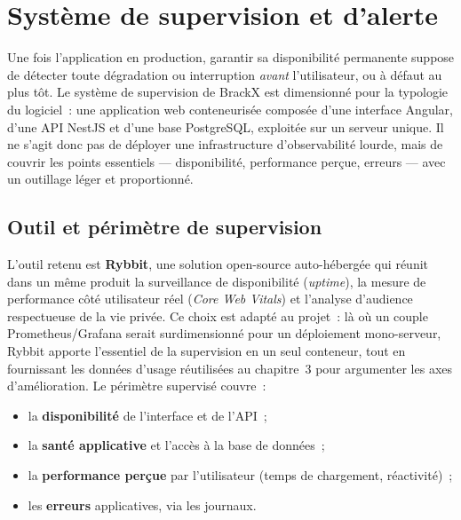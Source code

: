 \section{Système de supervision et d'alerte}
\label{sec:supervision}

Une fois l'application en production, garantir sa disponibilité permanente suppose de détecter toute dégradation ou interruption \emph{avant} l'utilisateur, ou à défaut au plus tôt. Le système de supervision de BrackX est dimensionné pour la typologie du logiciel~: une application web conteneurisée composée d'une interface Angular, d'une API NestJS et d'une base PostgreSQL, exploitée sur un serveur unique. Il ne s'agit donc pas de déployer une infrastructure d'observabilité lourde, mais de couvrir les points essentiels — disponibilité, performance perçue, erreurs — avec un outillage léger et proportionné.

\subsection{Outil et périmètre de supervision}
L'outil retenu est \textbf{Rybbit}, une solution open-source auto-hébergée qui réunit dans un même produit la surveillance de disponibilité (\emph{uptime}), la mesure de performance côté utilisateur réel (\emph{Core Web Vitals}) et l'analyse d'audience respectueuse de la vie privée. Ce choix est adapté au projet~: là où un couple Prometheus/Grafana serait surdimensionné pour un déploiement mono-serveur, Rybbit apporte l'essentiel de la supervision en un seul conteneur, tout en fournissant les données d'usage réutilisées au chapitre~3 pour argumenter les axes d'amélioration. Le périmètre supervisé couvre~:
\begin{itemize}
    \item la \textbf{disponibilité} de l'interface et de l'API~;
    \item la \textbf{santé applicative} et l'accès à la base de données~;
    \item la \textbf{performance perçue} par l'utilisateur (temps de chargement, réactivité)~;
    \item les \textbf{erreurs} applicatives, via les journaux.
\end{itemize}

